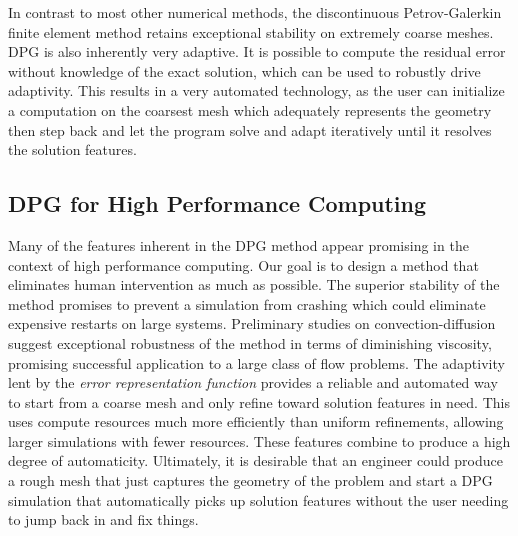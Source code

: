 \documentclass[preprint,12pt]{elsarticle}
\begin{document}
In contrast to most other numerical methods, the discontinuous Petrov-Galerkin finite element method retains exceptional stability on extremely coarse meshes.
DPG is also inherently very adaptive.
It is possible to compute the residual error without knowledge of the exact solution, which can be used to robustly drive adaptivity.
This results in a very automated technology, as the user can initialize a computation on the coarsest mesh which adequately represents the geometry 
then step back and let the program solve and adapt iteratively until it resolves the solution features.

%                                
%                                
%   
\subsection{DPG for High Performance Computing}
Many of the features inherent in the DPG method appear promising in the context of high performance computing.
Our goal is to design a method that eliminates human intervention as much as possible.
The superior stability of the method promises to prevent a simulation from crashing which could eliminate expensive restarts on large systems.
Preliminary studies on convection-diffusion suggest exceptional robustness of the method in terms of diminishing viscosity, 
promising successful application to a large class of flow problems.
The adaptivity lent by the \emph{error representation function} provides a reliable and automated way to start from a coarse mesh and only refine
toward solution features in need. 
This uses compute resources much more efficiently than uniform refinements, allowing larger simulations with fewer resources.
These features combine to produce a high degree of automaticity.
Ultimately, it is desirable that an engineer could produce a rough mesh that just captures the geometry of the problem and
start a DPG simulation that automatically picks up solution features without the user needing to jump back in and fix things.
\end{document}
